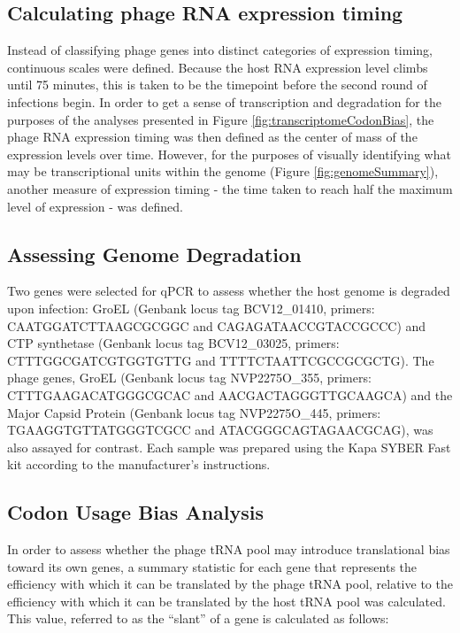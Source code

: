 \documentclass[12pt,twoside]{mitthesis-manusdown}
\begin{document}
\subsection{Calculating phage RNA expression
timing}\label{calculating-phage-rna-expression-timing}

Instead of classifying phage genes into distinct categories of
expression timing, continuous scales were defined. Because the host RNA
expression level climbs until 75 minutes, this is taken to be the
timepoint before the second round of infections begin. In order to get a
sense of transcription and degradation for the purposes of the analyses
presented in Figure \ref{fig:transcriptomeCodonBias}, the phage RNA
expression timing was then defined as the center of mass of the
expression levels over time. However, for the purposes of visually
identifying what may be transcriptional units within the genome (Figure
\ref{fig:genomeSummary}), another measure of expression timing - the
time taken to reach half the maximum level of expression - was defined.

\subsection{Assessing Genome
Degradation}\label{assessing-genome-degradation}

Two genes were selected for qPCR to assess whether the host genome is
degraded upon infection: GroEL (Genbank locus tag BCV12\_01410, primers:
CAATGGATCTTAAGCGCGGC and CAGAGATAACCGTACCGCCC) and CTP synthetase
(Genbank locus tag BCV12\_03025, primers: CTTTGGCGATCGTGGTGTTG and
TTTTCTAATTCGCCGCGCTG). The phage genes, GroEL (Genbank locus tag
NVP2275O\_355, primers: CTTTGAAGACATGGGCGCAC and AACGACTAGGGTTGCAAGCA)
and the Major Capsid Protein (Genbank locus tag NVP2275O\_445, primers:
TGAAGGTGTTATGGGTCGCC and ATACGGGCAGTAGAACGCAG), was also assayed for
contrast. Each sample was prepared using the Kapa SYBER Fast kit
according to the manufacturer's instructions.

\subsection{Codon Usage Bias Analysis}\label{codon-usage-bias-analysis}

In order to assess whether the phage tRNA pool may introduce
translational bias toward its own genes, a summary statistic for each
gene that represents the efficiency with which it can be translated by
the phage tRNA pool, relative to the efficiency with which it can be
translated by the host tRNA pool was calculated. This value, referred to
as the ``slant'' of a gene is calculated as follows:
\end{document}
